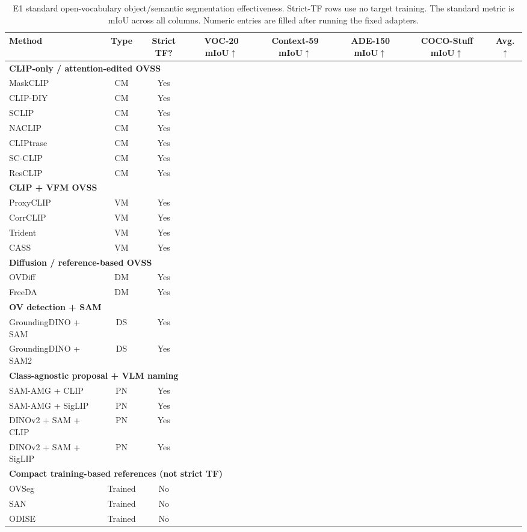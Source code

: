 \documentclass[11pt,a4paper]{article}
\newcommand{\up}{\ensuremath{\uparrow}}
\begin{document}
\begin{table}[H]
\centering
\scriptsize
\caption{E1 standard open-vocabulary object/semantic segmentation effectiveness. Strict-TF rows use no target training. The standard metric is mIoU across all columns. Numeric entries are filled after running the fixed adapters.}
\label{tab:e1-effectiveness}
\setlength{\tabcolsep}{3pt}
\begin{adjustbox}{max width=\textwidth}
\begin{tabular}{l c c c c c c c}
\toprule
Method & Type & Strict TF? & VOC-20 mIoU\up & Context-59 mIoU\up & ADE-150 mIoU\up & COCO-Stuff mIoU\up & Avg.\up \\
\midrule
\multicolumn{8}{l}{\textbf{CLIP-only / attention-edited OVSS}} \\
MaskCLIP & CM & Yes & & & & & \\
CLIP-DIY & CM & Yes & & & & & \\
SCLIP & CM & Yes & & & & & \\
NACLIP & CM & Yes & & & & & \\
CLIPtrase & CM & Yes & & & & & \\
SC-CLIP & CM & Yes & & & & & \\
ResCLIP & CM & Yes & & & & & \\
\midrule
\multicolumn{8}{l}{\textbf{CLIP + VFM OVSS}} \\
ProxyCLIP & VM & Yes & & & & & \\
CorrCLIP & VM & Yes & & & & & \\
Trident & VM & Yes & & & & & \\
CASS & VM & Yes & & & & & \\
\midrule
\multicolumn{8}{l}{\textbf{Diffusion / reference-based OVSS}} \\
OVDiff & DM & Yes & & & & & \\
FreeDA & DM & Yes & & & & & \\
\midrule
\multicolumn{8}{l}{\textbf{OV detection + SAM}} \\
GroundingDINO + SAM & DS & Yes & & & & & \\
GroundingDINO + SAM2 & DS & Yes & & & & & \\
\midrule
\multicolumn{8}{l}{\textbf{Class-agnostic proposal + VLM naming}} \\
SAM-AMG + CLIP & PN & Yes & & & & & \\
SAM-AMG + SigLIP & PN & Yes & & & & & \\
DINOv2 + SAM + CLIP & PN & Yes & & & & & \\
DINOv2 + SAM + SigLIP & PN & Yes & & & & & \\
\midrule
\multicolumn{8}{l}{\textbf{Compact training-based references (not strict TF)}} \\
OVSeg & Trained & No & & & & & \\
SAN & Trained & No & & & & & \\
ODISE & Trained & No & & & & & \\
\bottomrule
\end{tabular}
\end{adjustbox}
\end{table}
\end{document}

